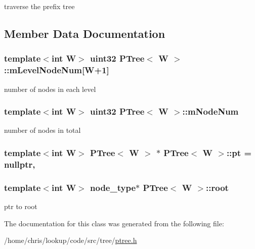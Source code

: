 traverse the prefix tree 



\subsection{Member Data Documentation}
\hypertarget{classPTree_aa4ae1d4235346aba797878a0415dc41b}{
\subsubsection[{m\-Level\-Node\-Num}]{\setlength{\rightskip}{0pt plus 5cm}template$<$int W$>$ {\bf uint32} {\bf P\-Tree}$<$ {\bf W} $>$\-::m\-Level\-Node\-Num\mbox{[}{\bf W}+1\mbox{]}\hspace{0.3cm}{\ttfamily [private]}}}\label{classPTree_aa4ae1d4235346aba797878a0415dc41b}


number of nodes in each level 

\hypertarget{classPTree_a3b5c4d673f63afded23d7ab31174d02d}{
\subsubsection[{m\-Node\-Num}]{\setlength{\rightskip}{0pt plus 5cm}template$<$int W$>$ {\bf uint32} {\bf P\-Tree}$<$ {\bf W} $>$\-::m\-Node\-Num\hspace{0.3cm}{\ttfamily [private]}}}\label{classPTree_a3b5c4d673f63afded23d7ab31174d02d}


number of nodes in total 

\hypertarget{classPTree_a78fb787b80f61d94c4ce92d1fd6f38b4}{
\subsubsection[{pt}]{\setlength{\rightskip}{0pt plus 5cm}template$<$int W$>$ {\bf P\-Tree}$<$ {\bf W} $>$ $\ast$ {\bf P\-Tree}$<$ {\bf W} $>$\-::pt = nullptr\hspace{0.3cm}{\ttfamily [static]}, {\ttfamily [private]}}}\label{classPTree_a78fb787b80f61d94c4ce92d1fd6f38b4}
\hypertarget{classPTree_ae87b3a544e048520a900456177af6e03}{
\subsubsection[{root}]{\setlength{\rightskip}{0pt plus 5cm}template$<$int W$>$ {\bf node\-\_\-type}$\ast$ {\bf P\-Tree}$<$ {\bf W} $>$\-::root\hspace{0.3cm}{\ttfamily [private]}}}\label{classPTree_ae87b3a544e048520a900456177af6e03}


ptr to root 



The documentation for this class was generated from the following file\-:\begin{DoxyCompactItemize}
\item 
/home/chris/lookup/code/src/tree/\hyperlink{ptree_8h}{ptree.\-h}\end{DoxyCompactItemize}
